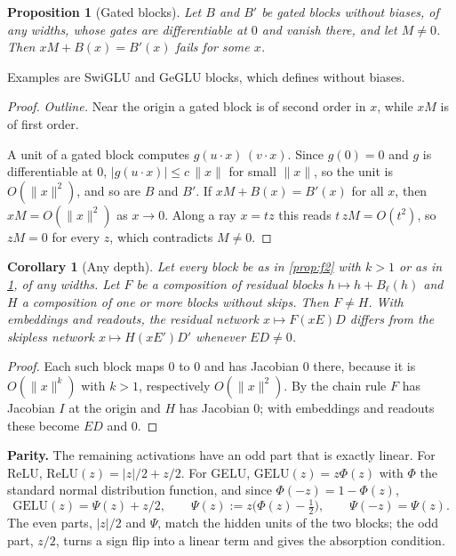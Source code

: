 \documentclass[10pt]{article}
\newtheorem{proposition}[theorem]{Proposition}
\newtheorem{corollary}[theorem]{Corollary}
\theoremstyle{definition}
\theoremstyle{remark}
\newcommand{\norm}[1]{\lVert #1\rVert}
\newcommand{\para}[1]{\smallskip\noindent\textbf{#1}\hspace{0.5em}}
\begin{document}
\begin{proposition}[Gated blocks]\label{prop:gated}
Let $B$ and $B'$ be gated blocks without biases, of any widths, whose gates are differentiable at $0$ and vanish there, and let $M \neq 0$. Then $xM + B(x) = B'(x)$ fails for some $x$.
\end{proposition}
Examples are SwiGLU and GeGLU blocks, which \citet{shazeer2020glu} defines without biases.
\begin{proof}
\emph{Outline.} Near the origin a gated block is of second order in $x$, while $xM$ is of first order.

A unit of a gated block computes $g(u\cdot x)\,(v\cdot x)$. Since $g(0) = 0$ and $g$ is differentiable at $0$, $\lvert g(u\cdot x)\rvert \le c\,\norm{x}$ for small $\norm{x}$, so the unit is $O(\norm{x}^2)$, and so are $B$ and $B'$. If $xM + B(x) = B'(x)$ for all $x$, then $xM = O(\norm{x}^2)$ as $x \to 0$. Along a ray $x = tz$ this reads $t\,zM = O(t^2)$, so $zM = 0$ for every $z$, which contradicts $M \neq 0$.
\end{proof}

\begin{corollary}[Any depth]\label{cor:depth}
Let every block be as in \cref{prop:f2} with $k > 1$ or as in \cref{prop:gated}, of any widths. Let $F$ be a composition of residual blocks $h \mapsto h + B_\ell(h)$ and $H$ a composition of one or more blocks without skips. Then $F \neq H$. With embeddings and readouts, the residual network $x \mapsto F(xE)D$ differs from the skipless network $x \mapsto H(xE')D'$ whenever $ED \neq 0$.
\end{corollary}
\begin{proof}
Each such block maps $0$ to $0$ and has Jacobian $0$ there, because it is $O(\norm{x}^k)$ with $k > 1$, respectively $O(\norm{x}^2)$. By the chain rule $F$ has Jacobian $I$ at the origin and $H$ has Jacobian $0$; with embeddings and readouts these become $ED$ and $0$.
\end{proof}

\para{Parity.} The remaining activations have an odd part that is exactly linear. For ReLU, $\mathrm{ReLU}(z) = |z|/2 + z/2$. For GELU, $\mathrm{GELU}(z) = z\Phi(z)$ with $\Phi$ the standard normal distribution function, and since $\Phi(-z) = 1 - \Phi(z)$,
\[
\mathrm{GELU}(z) = \Psi(z) + z/2,\qquad \Psi(z) := z\big(\Phi(z) - \tfrac12\big),\qquad \Psi(-z) = \Psi(z).
\]
The even parts, $|z|/2$ and $\Psi$, match the hidden units of the two blocks; the odd part, $z/2$, turns a sign flip into a linear term and gives the absorption condition.
\end{document}
